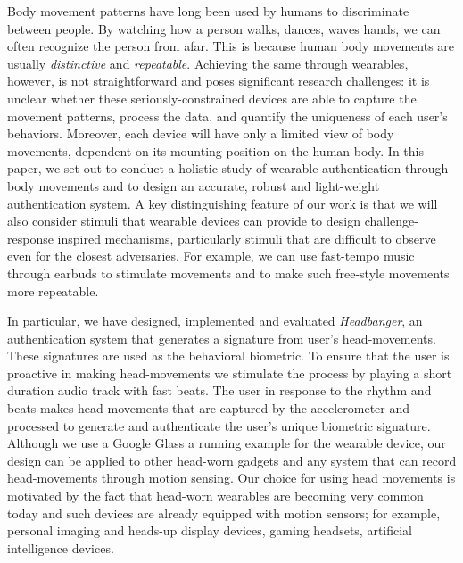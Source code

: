 \vspace{1mm} Body movement 
patterns have long been used by humans to discriminate between people. By 
watching how a person walks, dances, waves hands, we can often recognize 
the person from afar. This is because human body movements are usually 
\emph{distinctive} and \emph{repeatable}. Achieving the same through 
wearables, however, is not straightforward and poses significant research 
challenges: it is unclear whether these seriously-constrained devices are able 
to capture the movement patterns, process the data, and quantify the 
uniqueness of each user's behaviors. Moreover, each device will have only a 
limited view of body movements, dependent on its mounting position on the 
human body. In this paper, we set out to conduct a holistic study of wearable 
authentication through body movements and to design an accurate, robust and 
light-weight authentication system. A key distinguishing feature of our work 
is that we will also consider stimuli that wearable devices can provide to 
design challenge-response inspired mechanisms, particularly stimuli that are 
difficult to observe even for the closest adversaries. For example, we can use 
fast-tempo music through earbuds to stimulate movements and to make such 
free-style movements more repeatable. 

In particular, we have designed, implemented and evaluated {\em Headbanger}, 
an authentication system that generates a signature from user's 
head-movements. These signatures are used as the behavioral biometric. To 
ensure that the user is proactive in making head-movements we stimulate the 
process by playing a short duration audio track with fast beats. The user in 
response to the rhythm and beats makes head-movements that are captured by the 
accelerometer and processed to
generate and authenticate the user's unique biometric signature. Although we 
use a Google Glass a running example for the wearable device, our design can 
be applied to other head-worn gadgets and any system that can record 
head-movements through motion sensing. Our choice for using head movements is 
motivated by the fact that head-worn wearables are becoming very common today 
and such devices are already equipped with motion sensors; for example, 
personal imaging and heads-up display devices, gaming headsets, artificial 
intelligence devices.


